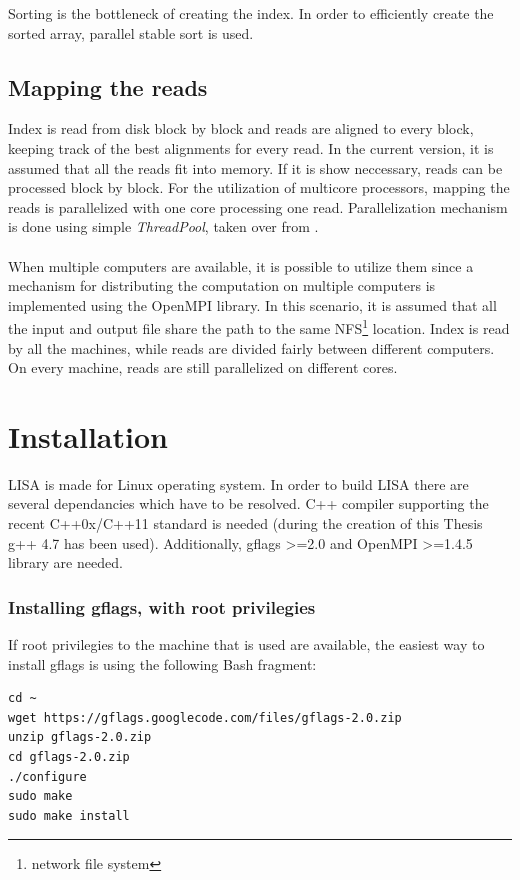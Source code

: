 \documentclass[times, utf8, diplomski]{fer}
\begin{document}
Sorting is the bottleneck of creating the index. In order to efficiently create the sorted array, parallel stable sort is used. 

\subsection{Mapping the reads}

Index is read from disk block by block and reads are aligned to every block, keeping track of the best alignments for every read. In the current version, it is assumed that all the reads fit into memory. If it is show neccessary, reads can be processed block by block. For the utilization of multicore processors, mapping the reads is parallelized with one core processing one read. Parallelization mechanism is done using simple \emph{ThreadPool}, taken over from \cite{thread.pool}.\\
\\
When multiple computers are available, it is possible to utilize them since a mechanism for distributing the computation on multiple computers is implemented using the OpenMPI \cite{gabriel04:_open_mpi} library. In this scenario, it is assumed that all the input and output file share the path to the same NFS\footnote{network file system} location. Index is read by all the machines, while reads are divided fairly between different computers. On every machine, reads are still parallelized on different cores.

\section{Installation}

LISA is made for Linux operating system. In order to build LISA there are several dependancies which have to be resolved. C++ compiler supporting the recent C++0x/C++11 standard is needed (during the creation of this Thesis g++ 4.7 has been used). Additionally, gflags >=2.0\cite{gflags} and OpenMPI >=1.4.5 library are needed.

\subsubsection{Installing gflags, with root privilegies}

If root privilegies to the machine that is used are available, the easiest way to install gflags is using the following Bash fragment:

\begin{lstlisting}
cd ~
wget https://gflags.googlecode.com/files/gflags-2.0.zip
unzip gflags-2.0.zip
cd gflags-2.0.zip
./configure
sudo make
sudo make install
\end{lstlisting}
\end{document}
